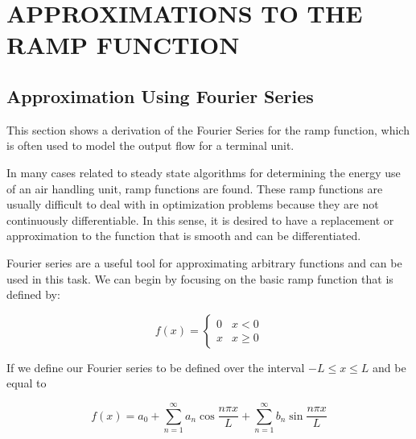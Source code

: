 %
%
%



\chapter{\uppercase{Approximations to the Ramp Function}}

\section{Approximation Using Fourier Series}

This section shows a derivation of the Fourier Series for the ramp
function, which is often used to model the output flow for a terminal
unit.

In many cases related to steady state algorithms for determining the
energy use of an air handling unit, ramp functions are found. These ramp
functions are usually difficult to deal with in optimization problems
because they are not continuously differentiable. In this sense, it is
desired to have a replacement or approximation to the function that is
smooth and can be differentiated. 

Fourier series are a useful tool for approximating arbitrary functions
and can be used in this task. We can begin by focusing on the basic ramp
function that is defined by:

\begin{equation}
f(x)=\begin{cases}0  & x < 0 \\
               x  & x \geq 0
\end{cases}
\end{equation}

If we define our Fourier series to be defined over the interval \(-L
\leq x \leq L\) and be equal to 

\begin{equation}
 f(x) = a_0 + \sum_{n=1}^\infty a_n \cos{\frac{n \pi x }{L}} + \sum_{n=1}^\infty b_n \sin{\frac{n \pi x }{L}}
\end{equation}

